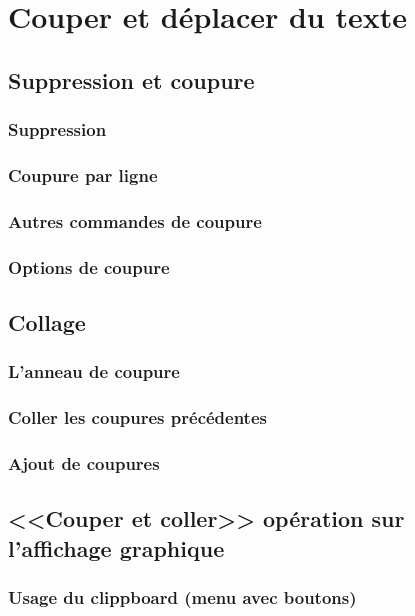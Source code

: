 \chapter{Couper et déplacer du texte}\label{chap9}
\section{Suppression et coupure}\label{chap9sec1}
\subsection{Suppression}\label{chap9sec1subsec1}
\subsection{Coupure par ligne}\label{chap9sec1subsec2}
\subsection{Autres commandes de coupure}\label{chap9sec1subsec3}
\subsection{Options de coupure}\label{chap9sec1subsec4}
\section{Collage}\label{chap9sec2}
\subsection{L'anneau de coupure}\label{chap9sec2subsec1}
\subsection{Coller les coupures précédentes}\label{chap9sec2subsec2}
\subsection{Ajout de coupures}\label{chap9sec2subsec3}
\section{<<Couper et coller>> opération sur l'affichage
  graphique}\label{chap9sec3} 
\subsection{Usage du clippboard (menu avec boutons)}\label{chap9sec3subsec1}
